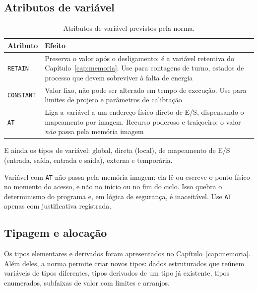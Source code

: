 \subsection{Atributos de variável}

\begin{table}[H]
  \centering
  \caption{Atributos de variável previstos pela norma.}
  \label{tab:atributos-variavel}
  \begin{tabular}{p{2.4cm} p{12.2cm}}
    \toprule
    Atributo & Efeito \\
    \midrule
    \texttt{RETAIN}
      & Preserva o valor após o desligamento: é a variável retentiva do
        Capítulo~\ref{cap:memoria}. Use para contagens de turno, estados de processo que devem
        sobreviver à falta de energia \\
    \texttt{CONSTANT}
      & Valor fixo, não pode ser alterado em tempo de execução. Use para limites de projeto e
        parâmetros de calibração \\
    \texttt{AT}
      & Liga a variável a um endereço físico direto de E/S, dispensando o mapeamento por imagem.
        Recurso poderoso e traiçoeiro: o valor \emph{não} passa pela memória imagem \\
    \bottomrule
  \end{tabular}
\end{table}

E ainda os tipos de variável: global, direta (local), de mapeamento de E/S (entrada, saída, entrada
e saída), externa e temporária.

\begin{atencao}
Variável com \texttt{AT} não passa pela memória imagem: ela lê ou escreve o ponto físico no momento
do acesso, e não no início ou no fim do ciclo. Isso quebra o determinismo do programa e, em lógica
de segurança, é inaceitável. Use \texttt{AT} apenas com justificativa registrada.
\end{atencao}

\subsection{Tipagem e alocação}

Os tipos elementares e derivados foram apresentados no Capítulo~\ref{cap:memoria}. Além deles, a
norma permite criar novos tipos: dados estruturados que reúnem variáveis de tipos diferentes, tipos
derivados de um tipo já existente, tipos enumerados, subfaixas de valor com limites e arranjos.

